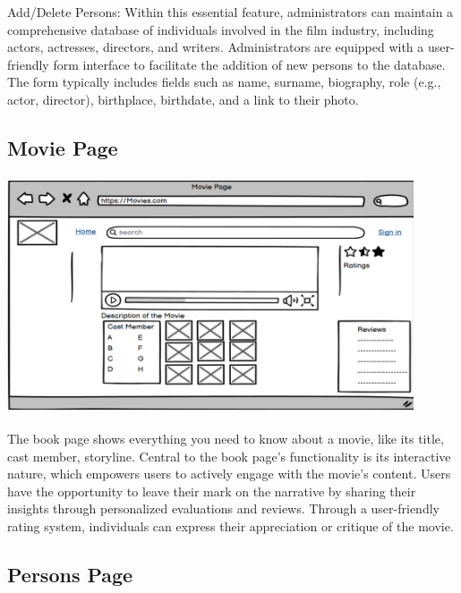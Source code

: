 Add/Delete Persons: Within this essential feature, administrators can maintain a comprehensive database of individuals involved in the film industry, including actors, actresses, directors, and writers. Administrators are equipped with a user-friendly form interface to facilitate the addition of new persons to the database. The form typically includes fields such as name, surname, biography, role (e.g., actor, director), birthplace, birthdate, and a link to their photo. 

\subsection{Movie Page}

\begin{center}
\includegraphics[width=12cm, height=7cm]{pictures/Movie Page.png}
\end{center}

The book page  shows everything you need to know about a movie, like its title, cast member, storyline. Central to the book page's functionality is its interactive nature, which empowers users to actively engage with the movie's content. Users have the opportunity to leave their mark on the narrative by sharing their insights through personalized evaluations and reviews. Through a user-friendly rating system, individuals can express their appreciation or critique of the movie.


\subsection{Persons Page}

